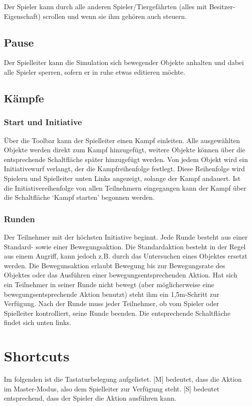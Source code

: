 \documentclass[german,10pt,a4paper,twocolumn,colorscheme=darkblue]{orarticle}
\begin{document}
			Der Spieler kann durch alle anderen Spieler/Tiergefährten (alles mit Besitzer-Eigenschaft) scrollen und wenn sie ihm gehören auch steuern.
			
		\subsection{Pause}
			Der Spielleiter kann die Simulation sich bewegender Objekte anhalten und dabei alle Spieler sperren, sofern er in ruhe etwas editieren möchte.
		
		\subsection{Kämpfe}
			\subsubsection*{Start und Initiative}
			Über die Toolbar kann der Spielleiter einen Kampf einleiten. Alle ausgewählten Objekte werden direkt zum Kampf hinzugefügt, weitere Objekte können über die entsprechende Schaltfläche später hinzugefügt werden. Von jedem Objekt wird ein Initiativewurf verlangt, der die Kampfreihenfolge festlegt. Diese Reihenfolge wird Spielern und Spielleiter unten Links angezeigt, solange der Kampf andauert. Ist die Initiativereihenfolge von allen Teilnehmern eingegangen kann der Kampf über die Schaltfläche `Kampf starten' begonnen werden.
			\subsubsection*{Runden}
			Der Teilnehmer mit der höchsten Initiative beginnt. Jede Runde besteht aus einer Standard- sowie einer Bewegungsaktion. Die Standardaktion besteht in der Regel aus einem Angriff, kann jedoch z.B. durch das Untersuchen eines Objektes ersetzt werden. Die Bewegunsaktion erlaubt Bewegung bis zur Bewegungsrate des Objektes oder das Ausführen einer bewegungsentsprechenden Aktion. Hat sich ein Teilnehmer in seiner Runde nicht bewegt (aber möglicherweise eine bewegungsentsprechende Aktion benutzt) steht ihm ein 1,5m-Schritt zur Verfügung. Nach der Runde muss jeder Teilnehmer, ob vom Spieler oder Spielleiter kontrolliert, seine Runde beenden. Die entsprechende Schaltfläche findet sich unten links.
			
	\section{Shortcuts}
		Im folgenden ist die Tastaturbelegung aufgelistet. [M] bedeutet, dass die Aktion im Master-Modus, also dem Spielleiter zur Verfügung steht. [S] bedeutet entsprechend, dass der Spieler die Aktion ausführen kann.\\
		
\end{document}
